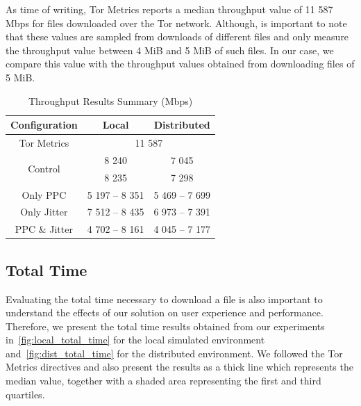 As time of writing, Tor Metrics reports a median throughput value of 11 587 Mbps for files downloaded over the Tor network. Although, is important to note that these values are sampled from downloads of different files and only measure the throughput value between 4 MiB and 5 MiB of such files. In our case, we compare this value with the throughput values obtained from downloading files of 5 MiB.

\begin{table}[htbp]
    \centering
    \begin{tabular}{|c|c|c|}
    \hline
    \textbf{Configuration} & \textbf{Local} & \textbf{Distributed} \\
    \hline
    Tor Metrics& \multicolumn{2}{c|}{11 587} \\ 
    \hline
    \multirow{2}{*}{Control} & 8 240 & 7 045\\ 
    & 8 235 & 7 298\\
    \hline
    Only PPC & 5 197 – 8 351 & 5 469 – 7 699\\
    \hline
    Only Jitter & 7 512 – 8 435 & 6 973 – 7 391\\
    \hline
    PPC \& Jitter & 4 702 – 8 161 & 4 045 – 7 177\\
    \hline
    \end{tabular}
    \caption{Throughput Results Summary (Mbps)}\label{tab:throughput_summary}
\end{table}

\FloatBarrier
\subsection{Total Time}

Evaluating the total time necessary to download a file is also important to understand the effects of our solution on user experience and performance. Therefore, we present the total time results obtained from our experiments in~\cref{fig:local_total_time} for the local simulated environment and~\cref{fig:dist_total_time} for the distributed environment. We followed the Tor Metrics directives and also present the results as a thick line which represents the median value, together with a shaded area representing the first and third quartiles.


